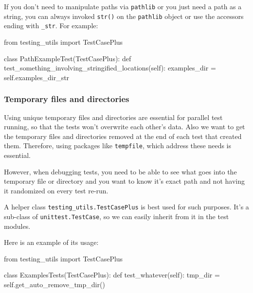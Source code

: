 \documentclass[
]{report}
\newenvironment{Shaded}{\begin{snugshade}}{\end{snugshade}}
\newcommand{\ImportTok}[1]{\textcolor[rgb]{0.00,0.46,0.62}{#1}}
\newcommand{\KeywordTok}[1]{\textcolor[rgb]{0.00,0.23,0.31}{#1}}
\newcommand{\NormalTok}[1]{\textcolor[rgb]{0.00,0.23,0.31}{#1}}
\newcommand{\OperatorTok}[1]{\textcolor[rgb]{0.37,0.37,0.37}{#1}}
\newcommand{\VariableTok}[1]{\textcolor[rgb]{0.07,0.07,0.07}{#1}}
\begin{document}
If you don't need to manipulate paths via \texttt{pathlib} or you just
need a path as a string, you can always invoked \texttt{str()} on the
\texttt{pathlib} object or use the accessors ending with \texttt{\_str}.
For example:

\begin{Shaded}
\begin{Highlighting}[]
\ImportTok{from}\NormalTok{ testing\_utils }\ImportTok{import}\NormalTok{ TestCasePlus}


\KeywordTok{class}\NormalTok{ PathExampleTest(TestCasePlus):}
    \KeywordTok{def}\NormalTok{ test\_something\_involving\_stringified\_locations(}\VariableTok{self}\NormalTok{):}
\NormalTok{        examples\_dir }\OperatorTok{=} \VariableTok{self}\NormalTok{.examples\_dir\_str}
\end{Highlighting}
\end{Shaded}

\subsubsection{Temporary files and
directories}\label{temporary-files-and-directories}

Using unique temporary files and directories are essential for parallel
test running, so that the tests won't overwrite each other's data. Also
we want to get the temporary files and directories removed at the end of
each test that created them. Therefore, using packages like
\texttt{tempfile}, which address these needs is essential.

However, when debugging tests, you need to be able to see what goes into
the temporary file or directory and you want to know it's exact path and
not having it randomized on every test re-run.

A helper class \texttt{testing\_utils.TestCasePlus} is best used for
such purposes. It's a sub-class of \texttt{unittest.TestCase}, so we can
easily inherit from it in the test modules.

Here is an example of its usage:

\begin{Shaded}
\begin{Highlighting}[]
\ImportTok{from}\NormalTok{ testing\_utils }\ImportTok{import}\NormalTok{ TestCasePlus}


\KeywordTok{class}\NormalTok{ ExamplesTests(TestCasePlus):}
    \KeywordTok{def}\NormalTok{ test\_whatever(}\VariableTok{self}\NormalTok{):}
\NormalTok{        tmp\_dir }\OperatorTok{=} \VariableTok{self}\NormalTok{.get\_auto\_remove\_tmp\_dir()}
\end{Highlighting}
\end{Shaded}
\end{document}
